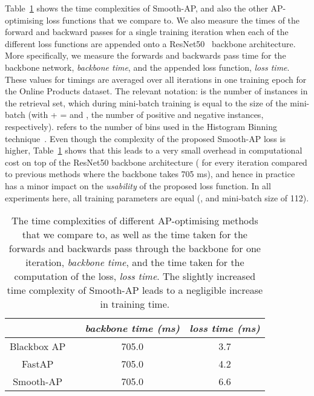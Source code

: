 \documentclass[runningheads]{llncs}
\newcommand\aftercaptions{\vspace{-5mm}}
\begin{document}
Table~\ref{tab:complexity} shows the time complexities of Smooth-AP, and also the other AP-optimising loss functions that we compare to. We also measure the times of the forward and backward passes for a single training iteration when each of the different loss functions are appended onto a ResNet50~\cite{he2016deep} backbone architecture. More specifically, we measure the forwards and backwards pass time for the backbone network, \textit{backbone time}, and the appended loss function, \textit{loss time}. These values for timings are averaged over all iterations in one training epoch for the Online Products dataset. The relevant notation: 
 is the number of instances in the retrieval set, which during mini-batch training is equal to the size of the mini-batch (with  +  =  and ,  the number of positive and negative instances, respectively). 
 refers to the number of bins used in the Histogram Binning technique~\cite{Cakir19,Ustinova16}. Even though the complexity of the proposed Smooth-AP loss is higher, Table~\ref{tab:complexity} shows that this leads to a very small overhead in computational cost on top of the ResNet50 backbone architecture ( for every iteration compared to previous methods where the backbone takes 705 ms), and hence in practice has a minor impact on the \textit{usability} of the proposed loss function. In all experiments here, all training parameters are equal (, and mini-batch size  of 112).

\begin{table}[ht]
\begin{center}
\begin{tabular}{c|c|c|c}
\hline
{} & {}& \textit{backbone time (ms)} & \textit{loss time (ms)} \\
\hline
Blackbox AP \cite{Rolnek20optimizing} &   & 705.0 & 3.7 \\
FastAP \cite{Cakir19} &  & 705.0 & 4.2 \\
Smooth-AP &  & 705.0 & 6.6 \\
\hline
\end{tabular}
\end{center}
\caption{\small{The time complexities of different AP-optimising methods that we compare to, as well as the time taken for the forwards and backwards pass through the backbone for one iteration, \textit{backbone time}, and the time taken for the computation of the loss, \textit{loss time}. The slightly increased time complexity of Smooth-AP leads to a negligible increase in training time.}}
\label{tab:complexity}
\aftercaptions
\end{table}

 \label{sec:related}
\end{document}
